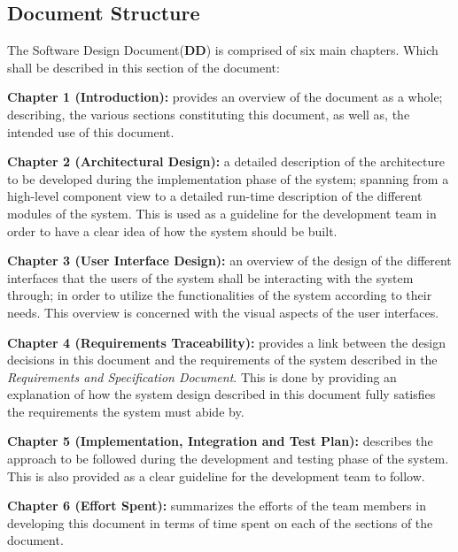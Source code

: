 \subsection{Document Structure}
The Software Design Document(\textbf{DD}) is comprised of six main chapters. Which shall be described in this section of the document:

\textbf{Chapter 1 (Introduction):} provides an overview of the document as a whole; describing, the various sections constituting this document, as well as, the intended use of this document.

\textbf{Chapter 2 (Architectural Design):} a detailed description of the architecture to be developed during the implementation phase of the system; spanning from a high-level component view to a detailed run-time description of the different modules of the system. This is used as a guideline for the development team in order to have a clear idea of how the system should be built.

\textbf{Chapter 3 (User Interface Design):} an overview of the design of the different interfaces that the users of the system shall be interacting with the system through; in order to utilize the functionalities of the system according to their needs. This overview is concerned with the visual aspects of the user interfaces.

\textbf{Chapter 4 (Requirements Traceability):} provides a link between the design decisions in this document and the requirements of the system described in the \emph{Requirements and Specification Document}. This is done by providing an explanation of how the system design described in this document fully satisfies the requirements the system must abide by.

\textbf{Chapter 5 (Implementation, Integration and Test Plan):} describes the approach to be followed during the development and testing phase of the system. This is also provided as a clear guideline for the development team to follow.

\textbf{Chapter 6 (Effort Spent):} summarizes the efforts of the team members in developing this document in terms of time spent on each of the sections of the document.

